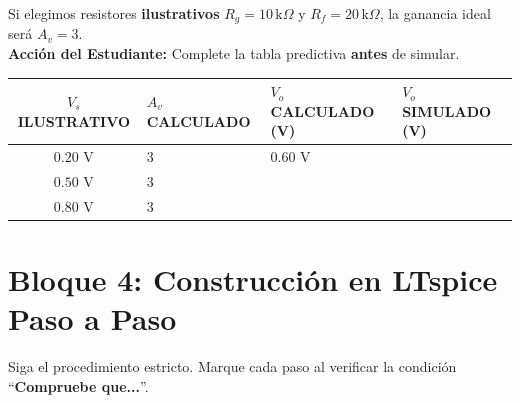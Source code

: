 \documentclass[11pt, a4paper]{article}
\begin{document}
\vspace{0.4cm}
Si elegimos resistores \textbf{ilustrativos} $R_g = 10\,\text{k}\Omega$ y $R_f = 20\,\text{k}\Omega$, la ganancia ideal será $A_v = 3$. \\
\textbf{Acción del Estudiante:} Complete la tabla predictiva \textbf{antes} de simular.

\begin{center}
\begin{tabularx}{0.9\textwidth}{@{} c X X X @{}}
\toprule
$V_s$ \textbf{ILUSTRATIVO} & $A_v$ \textbf{CALCULADO} & $V_o$ \textbf{CALCULADO (V)} & $V_o$ \textbf{SIMULADO (V)} \\ \midrule
$0.20$ V & $3$ & $0.60$ V & \\ \addlinespace
$0.50$ V & $3$ & & \\ \addlinespace
$0.80$ V & $3$ & & \\ \bottomrule
\end{tabularx}
\end{center}

\newpage
\section{Bloque 4: Construcción en LTspice Paso a Paso}

Siga el procedimiento estricto. Marque cada paso al verificar la condición ``\textbf{Compruebe que...}''.
\end{document}
